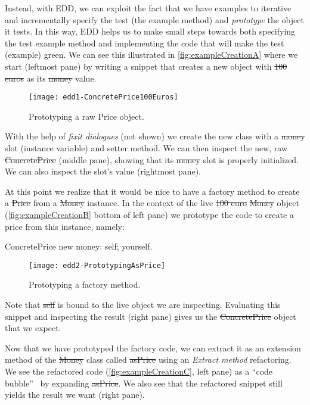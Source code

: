 \documentclass[sigplan,anonymous,review,10pt]{acmart}
\begin{document}
Instead, with EDD, we can exploit the fact that we have examples to iterative and incrementally specify the test (\ie the example method) and \emph{prototype} the object it tests.
In this way, EDD helps us to make small steps towards both specifying the test example method and implementing the code that will make the test (example) green.
We can see this illustrated in \autoref{fig:exampleCreationA} where we start (leftmost pane) by writing a snippet that creates a new  object with \st{100 euros} as its \st{money} value.
\begin{figure}[h]
  \texttt{[image: edd1-ConcretePrice100Euros]}
	\caption{Prototyping a raw Price object.}
  \label{fig:exampleCreationA}
\end{figure}

With the help of \emph{fixit dialogues} (not shown) we create the new class with a \st{money} slot (instance variable) and setter method.
We can then inspect the new, raw \st{ConcretePrice} (middle pane), showing that its \st{money} slot is properly initialized.
We can also inspect the slot's value (rightmost pane).

At this point we realize that it would be nice to have a factory method to create a \st{Price} from a \st{Money} instance.
In the context of the live \st{100 euro} \st{Money} object (\autoref{fig:exampleCreationB} bottom of left pane) we prototype the code to create a price from this instance, namely:
\begin{code}
ConcretePrice new money: self; yourself.
\end{code}

\begin{figure}[h]
  \texttt{[image: edd2-PrototypingAsPrice]}
	\caption{Prototyping a factory method.}
  \label{fig:exampleCreationB}
\end{figure}

Note that \st{self} is bound to the live object we are inspecting.
Evaluating this snippet and inspecting the result (right pane) gives us the \st{ConcretePrice} object that we expect.

Now that we have prototyped the factory code, we can extract it as an extension method of the \st{Money} class called \st{asPrice} using an \emph{Extract method} refactoring.
We see the refactored code (\autoref{fig:exampleCreationC}, left pane) as a ``code bubble''~\cite{Brag10a} by expanding \st{asPrice}.
We also see that the refactored snippet still yields the result we want (right pane).
\end{document}
